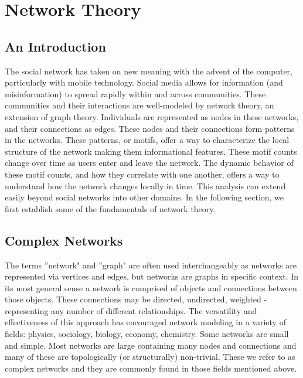 %

\chapter{Network Theory}

\section{An Introduction}
The social network has taken on new meaning with the advent of the computer, particularly with 
mobile technology. Social media allows for information (and misinformation) to spread rapidly
within and across communities. These communities and their interactions are well-modeled by network theory, an extension of graph theory.
Individuals are represented as nodes in these networks, and their connections as edges. These nodes and their
connections form patterns in the networks. These patterns, or motifs, offer
a way to characterize the local structure of the network making them informational features. These motif counts change
over time as users enter and leave the network. The dynamic behavior of these motif counts, and how they correlate with 
one another, offers a way to understand how the network changes locally in time. This analysis can 
extend easily beyond social networks into other domains. In the following section, we first establish 
some of the fundamentals of network theory.


\section{Complex Networks}
The terms ''network" and ''graph" are often used interchangeably as networks are represented
via vertices and edges, but networks are graphs in specific context. In its 
most general sense a network is comprised of objects and connections between those objects. These
connections may be directed, undirected, weighted - representing any number of different relationships. 
The versatility and effectiveness of this approach has encouraged network modeling in a 
variety of fields: physics, sociology, biology, economy, chemistry.
Some networks are small and simple. Most networks are large containing many nodes and connections and many of these are
topologically (or structurally) non-trivial. These we refer to as complex networks and they are 
commonly found in those fields mentioned above. 

